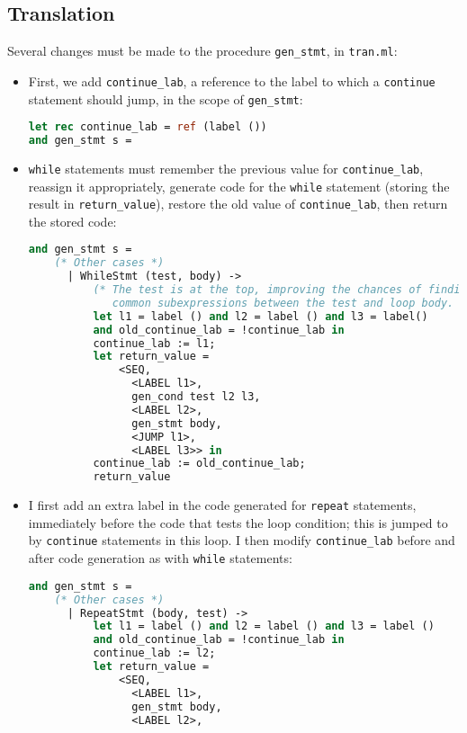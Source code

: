 \documentclass[a4paper,9pt]{article}
\begin{document}
\subsection{Translation}
Several changes must be made to the procedure \texttt{gen\_stmt}, in \texttt{tran.ml}:
\begin{itemize}
    \item First, we add \texttt{continue\_lab}, a reference to the label to which a \texttt{continue} statement should jump, in the scope of \texttt{gen\_stmt}:
\begin{lstlisting}[language=ml]
let rec continue_lab = ref (label ())
and gen_stmt s = 
\end{lstlisting}
    \item \texttt{while} statements must remember the previous value for \texttt{continue\_lab}, reassign it appropriately, generate code for the \texttt{while} statement (storing the result in \texttt{return\_value}), restore the old value of \texttt{continue\_lab}, then return the stored code:
\begin{lstlisting}[language=ml]
and gen_stmt s = 
    (* Other cases *)
      | WhileStmt (test, body) ->
          (* The test is at the top, improving the chances of finding
             common subexpressions between the test and loop body. *)
          let l1 = label () and l2 = label () and l3 = label()
          and old_continue_lab = !continue_lab in
          continue_lab := l1;
          let return_value = 
              <SEQ,
                <LABEL l1>,
                gen_cond test l2 l3,
                <LABEL l2>,
                gen_stmt body,
                <JUMP l1>,
                <LABEL l3>> in
          continue_lab := old_continue_lab;
          return_value
\end{lstlisting}
    \item I first add an extra label in the code generated for \texttt{repeat} statements, immediately before the code that tests the loop condition; this is jumped to by \texttt{continue} statements in this loop. I then modify \texttt{continue\_lab} before and after code generation as with \texttt{while} statements:
\begin{lstlisting}[language=ml]
and gen_stmt s = 
    (* Other cases *)
      | RepeatStmt (body, test) ->
          let l1 = label () and l2 = label () and l3 = label ()
          and old_continue_lab = !continue_lab in
          continue_lab := l2;
          let return_value = 
              <SEQ,
                <LABEL l1>,
                gen_stmt body, 
                <LABEL l2>,

\end{lstlisting}
\end{itemize}
\end{document}
